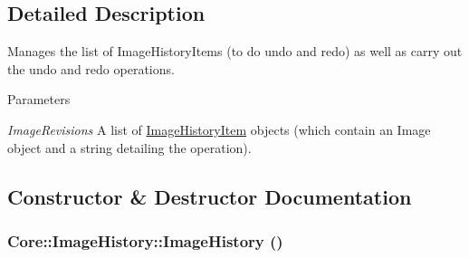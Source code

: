 \subsection{Detailed Description}
Manages the list of ImageHistoryItems (to do undo and redo) as well as carry out the undo and redo operations.


\begin{DoxyParams}{Parameters}
\item[{\em ImageRevisions}]A list of \hyperlink{class_core_1_1_image_history_item}{ImageHistoryItem} objects (which contain an Image object and a string detailing the operation). \end{DoxyParams}


\subsection{Constructor \& Destructor Documentation}
\hypertarget{class_core_1_1_image_history_afd0731bf62c251559970493943977486}{
\subsubsection[{ImageHistory}]{\setlength{\rightskip}{0pt plus 5cm}Core::ImageHistory::ImageHistory ()}}
\label{class_core_1_1_image_history_afd0731bf62c251559970493943977486}


